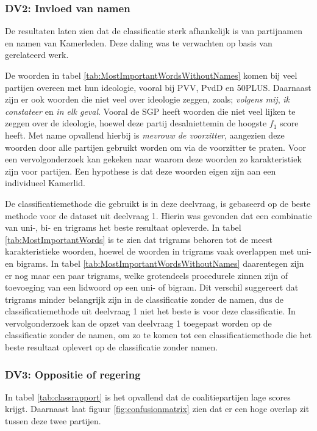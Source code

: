 \subsubsection{DV2: Invloed van namen}
De resultaten laten zien dat de classificatie sterk afhankelijk is van partijnamen en namen van Kamerleden. Deze daling was te verwachten op basis van gerelateerd werk.\par
De woorden in tabel \ref{tab:MostImportantWordsWithoutNames} komen bij veel partijen overeen met hun ideologie, vooral bij PVV, PvdD en 50PLUS. Daarnaast zijn er ook woorden die niet veel over ideologie zeggen, zoals; \textit{volgens mij}, \textit{ik constateer} en \textit{in elk geval}. Vooral de SGP heeft woorden die niet veel lijken te zeggen over de ideologie, hoewel deze partij desalniettemin de hoogste $f_1$ score heeft. Met name opvallend hierbij is \textit{mevrouw de voorzitter}, aangezien deze woorden door alle partijen gebruikt worden om via de voorzitter te praten. Voor een vervolgonderzoek kan gekeken naar waarom deze woorden zo karakteristiek zijn voor partijen. Een hypothese is dat deze woorden eigen zijn aan een individueel Kamerlid.\par
De classificatiemethode die gebruikt is in deze deelvraag, is gebaseerd op de beste methode voor de dataset uit deelvraag 1. Hierin was gevonden dat een combinatie van uni-, bi- en trigrams het beste resultaat opleverde. In tabel \ref{tab:MostImportantWords} is te zien dat trigrams behoren tot de meest karakteristieke woorden, hoewel de woorden in trigrams vaak overlappen met uni- en bigrams. In tabel \ref{tab:MostImportantWordsWithoutNames} daarentegen zijn er nog maar een paar trigrams, welke grotendeels procedurele zinnen zijn of toevoeging van een lidwoord op een uni- of bigram. Dit verschil suggereert dat trigrams minder belangrijk zijn in de classificatie zonder de namen, dus de classificatiemethode uit deelvraag 1 niet het beste is voor deze classificatie. In vervolgonderzoek kan de opzet van deelvraag 1 toegepast worden op de classificatie zonder de namen, om zo te komen tot een classificatiemethode die het beste resultaat oplevert op de classificatie zonder namen.\par 

\subsubsection{DV3: Oppositie of regering}
In tabel \ref{tab:classrapport} is het opvallend dat de coalitiepartijen lage scores krijgt. Daarnaast laat figuur \ref{fig:confusionmatrix} zien dat er een hoge overlap zit tussen deze twee partijen.\par

